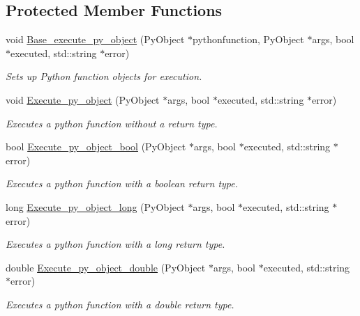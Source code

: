 \subsection*{Protected Member Functions}
\begin{DoxyCompactItemize}
\item 
void \hyperlink{classjetfuel_1_1inspire_1_1Python__module__loader_a54677f790da88ca5ff397555449efafc}{Base\+\_\+execute\+\_\+py\+\_\+object} (Py\+Object $\ast$pythonfunction, Py\+Object $\ast$args, bool $\ast$executed, std\+::string $\ast$error)
\begin{DoxyCompactList}\small\item\em Sets up Python function objects for execution. \end{DoxyCompactList}\item 
void \hyperlink{classjetfuel_1_1inspire_1_1Python__module__loader_a0df6c4f0f9b7fb8fcd97483e6eb841a8}{Execute\+\_\+py\+\_\+object} (Py\+Object $\ast$args, bool $\ast$executed, std\+::string $\ast$error)
\begin{DoxyCompactList}\small\item\em Executes a python function without a return type. \end{DoxyCompactList}\item 
bool \hyperlink{classjetfuel_1_1inspire_1_1Python__module__loader_a97bac700d3f89eb294f438802c82667f}{Execute\+\_\+py\+\_\+object\+\_\+bool} (Py\+Object $\ast$args, bool $\ast$executed, std\+::string $\ast$error)
\begin{DoxyCompactList}\small\item\em Executes a python function with a boolean return type. \end{DoxyCompactList}\item 
long \hyperlink{classjetfuel_1_1inspire_1_1Python__module__loader_a05e19263c55ee6d5acc5e22b00e03e55}{Execute\+\_\+py\+\_\+object\+\_\+long} (Py\+Object $\ast$args, bool $\ast$executed, std\+::string $\ast$error)
\begin{DoxyCompactList}\small\item\em Executes a python function with a long return type. \end{DoxyCompactList}\item 
double \hyperlink{classjetfuel_1_1inspire_1_1Python__module__loader_a0fca60192c29e3f7db689c366fd73437}{Execute\+\_\+py\+\_\+object\+\_\+double} (Py\+Object $\ast$args, bool $\ast$executed, std\+::string $\ast$error)
\begin{DoxyCompactList}\small\item\em Executes a python function with a double return type. \end{DoxyCompactList}\item 

\end{DoxyCompactItemize}

